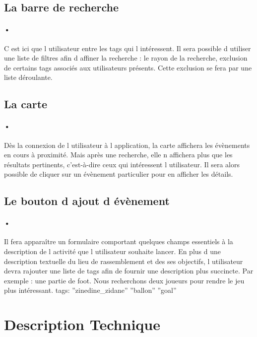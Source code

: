 \documentclass[pdftex,12pt,a4paper]{article}
\begin{document}
\subsection{La barre de recherche}
\paragraph{•}
C est ici que l utilisateur entre les tags qui l int\'eressent. Il sera possible d utiliser une liste de filtres afin d affiner la recherche : le rayon de la recherche, exclusion de certains tags associ\'es aux utilisateurs pr\'esents. Cette exclusion se fera par une liste déroulante.

\subsection{La carte}
\paragraph{•}
D\`es la connexion de l utilisateur \`a l application, la carte affichera les \'ev\`enements en cours \`a proximit\'e. Mais apr\`es une recherche, elle n affichera plus que les r\'esultats pertinents, c’est-à-dire ceux qui int\'eressent l utilisateur. Il sera alors possible de cliquer sur un \'ev\`enement particulier pour en afficher les d\'etails. 

\subsection{Le bouton d ajout d \'ev\`enement}
\paragraph{•}
Il fera appara\^itre un formulaire comportant quelques champs essentiels à la description de l activit\'e que l utilisateur souhaite lancer. En plus d une description textuelle du lieu de rassemblement et des ses objectifs, l utilisateur devra rajouter une liste de tags afin de fournir une description plus succincte.
Par exemple : une partie de foot. Nous recherchons deux joueurs pour rendre le jeu plus int\'eressant. tags: ''zinedine\_zidane'' ''ballon'' ''goal''

\newpage
\section{Description Technique}
\end{document}
